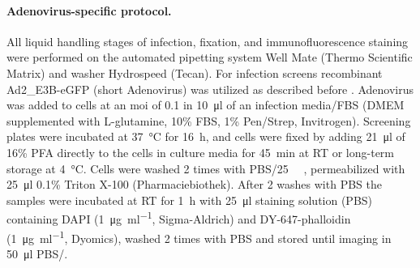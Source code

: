 \paragraph{Adenovirus-specific protocol.}
All liquid handling stages of infection, fixation, and immunofluorescence staining were performed on the automated pipetting system Well Mate (Thermo Scientific Matrix) and washer Hydrospeed (Tecan). For infection screens recombinant Ad2\_\textDelta E3B-eGFP (short Adenovirus) was utilized as described before \citep{Suomalainen2013,Yakimovich2012}. Adenovirus was added to cells at an \gls{moi} of 0.1 in \SI{10}{\micro\litre} of an infection media\slash FBS (DMEM supplemented with L-glutamine, 10\% FBS, 1\% Pen\slash Strep, Invitrogen). Screening plates were incubated at \SI{37}{\celsius} for \SI{16}{\hour}, and cells were fixed by adding \SI{21}{\micro\litre} of 16\% PFA directly to the cells in culture media for \SI{45}{\minute} at RT or long-term storage at \SI{4}{\celsius}. Cells were washed 2 times with PBS\slash \SI{25}{\milli\Molar} , permeabilized with \SI{25}{\micro\litre} 0.1\% Triton X-100 (Pharmaciebiothek). After 2 washes with PBS the samples were incubated at RT for \SI{1}{\hour} with \SI{25}{\micro\litre} staining solution (PBS) containing DAPI (\SI{1}{\micro\gram\per\milli\litre}, Sigma-Aldrich) and DY-647-phalloidin (\SI{1}{\micro\gram\per\milli\litre}, Dyomics), washed 2 times with PBS and stored until imaging in \SI{50}{\micro\litre} PBS\slash {}.

